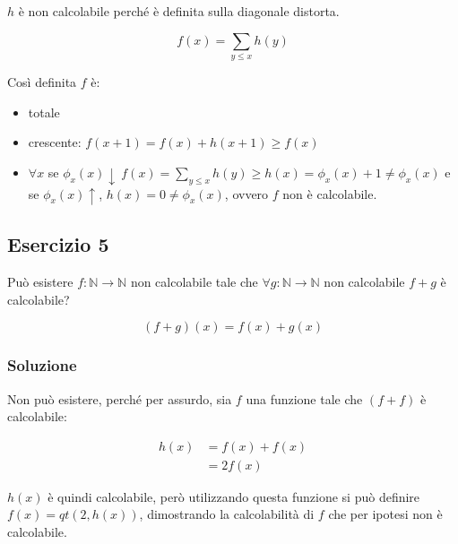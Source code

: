 $ h $ è non calcolabile perché è definita sulla diagonale distorta.

$$
f(x) = \sum\limits_{y \leq x} h(y)
$$

Così definita $ f $ è:
\begin{itemize}
	\item totale
	\item crescente: $ f(x+1) = f(x) + h(x+1) \geq f(x) $
	\item $ \forall x $ se $ \phi_x(x) \downarrow \: f(x) = \sum\limits_{y \leq x} h(y) \geq h(x) = \phi_x(x) +1 \neq \phi_x(x) $ e se $ \phi_x(x) \uparrow $, $ h(x) = 0 \neq \phi_x(x) $, ovvero $ f $ non è calcolabile.
\end{itemize}

\subsection{Esercizio 5}

Può esistere $ f : \mathbb{N} \rightarrow \mathbb{N} $ non calcolabile tale che $ \forall g : \mathbb{N} \rightarrow \mathbb{N} $ non calcolabile $ f+g  $ è calcolabile?

$$
(f+g)(x) = f(x) + g(x)
$$

\subsubsection{Soluzione}

Non può esistere, perché per assurdo, sia $ f $ una funzione tale che $ (f+f) $ è calcolabile:

\begin{align*}
h(x) &= f(x) + f(x) \\
		&= 2 f(x)
\end{align*}

$h(x)$ è quindi calcolabile, però utilizzando questa funzione si può definire $ f(x) = qt(2, h(x)) $, dimostrando la calcolabilità di $ f $ che per ipotesi non è calcolabile.


